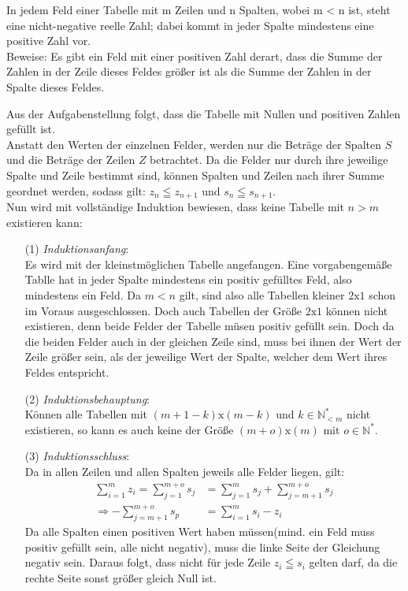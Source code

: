 \documentclass[10pt, a4paper]{amsart}
\makeatletter
\renewenvironment{proof}[1][\proofname]{\par
\pushQED{\qed}%
\normalfont \topsep6\p@\@plus6\p@\relax
\trivlist
\item\relax
{\bfseries#1}\hspace\labelsep\ignorespaces
}{%
\popQED\endtrivlist\@endpefalse
}
\makeatother
\begin{document}
\newpage
\begin{aufgabe}
  In jedem Feld einer Tabelle mit m Zeilen und n Spalten, wobei m < n ist, steht
  eine nicht-negative reelle
  Zahl; dabei kommt in jeder Spalte mindestens eine positive Zahl vor.\\
  Beweise: Es gibt ein Feld mit einer positiven Zahl derart, dass die Summe der
  Zahlen in der Zeile dieses
  Feldes größer ist als die Summe der Zahlen in der Spalte dieses Feldes.\\
\end{aufgabe}
\begin{proof}
  Aus der Aufgabenstellung folgt, dass die Tabelle mit Nullen und positiven
  Zahlen gefüllt ist.\\
  Anstatt den Werten der einzelnen Felder, werden nur die Beträge der Spalten
  $S$ und die Beträge der Zeilen $Z$ betrachtet. Da die Felder nur durch ihre
  jeweilige Spalte und Zeile bestimmt sind, können Spalten und Zeilen nach ihrer
  Summe geordnet werden, sodass gilt: $z_n\leqq z_{n+1}$ und $s_n\leqq s_{n+1}$.\\
  Nun wird mit vollständige Induktion bewiesen, dass keine Tabelle mit $n > m$
  existieren kann:\\
  \begin{itemize}[itemsep=2ex]
  \item[(1)]\emph{Induktionsanfang}:\\
    Es wird mit der kleinstmöglichen Tabelle angefangen. Eine vorgabengemäße
    Tablle hat in jeder Spalte mindestens ein positiv gefülltes Feld, also
    mindestens ein Feld. Da $m<n$ gilt, sind also alle Tabellen kleiner
    $2\text{x}1$ schon im Voraus ausgeschlossen. Doch auch Tabellen der Größe
    $2\text{x}1$ können nicht existieren, denn beide Felder der Tabelle müsen
    positiv gefüllt sein. Doch da die beiden Felder auch in der gleichen Zeile
    sind, muss bei ihnen der Wert der Zeile größer sein, als der jeweilige Wert
    der Spalte, welcher dem Wert ihres Feldes entspricht.
  \item[(2)]\emph{Induktionsbehauptung}:\\
    Können alle Tabellen mit $(m+1-k)\text{x}(m-k)$ und $k∈ℕ^*_{<m}$ nicht
    existieren, so kann es auch keine der Größe $(m+o)\text{x}(m)$ mit $o∈ℕ^*$.
  \item[(3)]\emph{Induktionsschluss}:\\
    Da in allen Zeilen und allen Spalten jeweils alle Felder liegen, gilt:
    \begin{align*}
      \sum_{i=1}^{m}z_i=\sum_{j=1}^{m+o}s_j&=\sum_{j=1}^{m}s_j+\sum_{j=m+1}^{m+o}s_j\\
      \Rightarrow -\sum_{j=m+1}^{m+o}s_p&= \sum_{i=1}^{m}s_i-z_i
    \end{align*}
    Da alle Spalten einen positiven Wert haben müssen(mind. ein Feld muss
    positiv gefüllt sein, alle nicht negativ), muss die linke Seite der
    Gleichung negativ sein. Daraus folgt, dass nicht für jede Zeile $z_i\leqq
    s_i$ gelten
    darf, da die rechte Seite sonst größer gleich Null ist.\\
    

\end{itemize}
\end{proof}
\end{document}
